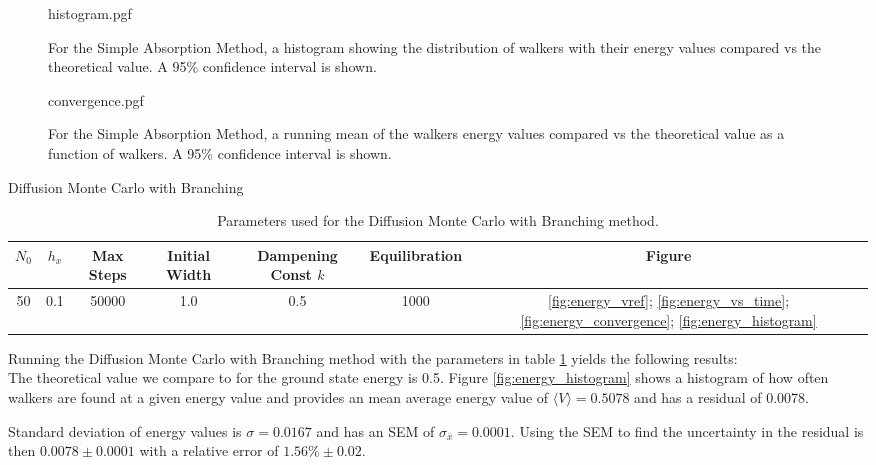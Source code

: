 \documentclass[reqno]{amsart}
\makeatletter
\renewcommand\subsection{\@startsection{subsection}{2}%
  \z@{.5\linespacing\@plus.7\linespacing}{-.5em}%
  {\normalfont\scshape\justify}}
\numberwithin{equation}{section}
\numberwithin{figure}{section}
\makeatother
\begin{document}
\begin{figure}[h]
    \centering
    {histogram.pgf}
    \caption{For the Simple Absorption Method, a histogram showing the distribution of walkers with their energy values compared vs the theoretical value. A 95\% confidence interval is shown.}
    \label{fig:SA_histogram}
\end{figure}

\begin{figure}[h]
    \centering
    {convergence.pgf}
    \caption{For the Simple Absorption Method, a running mean of the walkers energy values compared vs the theoretical value as a function of walkers. A 95\% confidence interval is shown.}
    \label{fig:SA_convergence}
\end{figure}

\subsection{Diffusion Monte Carlo with Branching}

\begin{table}[h]
    \centering
    \begin{tabular}{ccccccc}
        \hline
        $N_0$ & $h_x$ & Max Steps & Initial Width & Dampening Const $k$ & Equilibration & Figure \\
        \hline
        50 & 0.1 & 50000 & 1.0 & 0.5 & 1000 & \ref{fig:energy_vref}; \ref{fig:energy_vs_time}; \ref{fig:energy_convergence}; \ref{fig:energy_histogram} \\
        \hline
    \end{tabular}
    \caption{Parameters used for the Diffusion Monte Carlo with Branching method.}
    \label{tab:DMCB_params}
\end{table}

Running the Diffusion Monte Carlo with Branching method with the parameters in table \ref{tab:DMCB_params} yields the following results: \\

The theoretical value we compare to for the ground state energy is 0.5. Figure \ref{fig:energy_histogram} shows a histogram of how often walkers are found at a given energy value and provides an mean average energy value of $\langle V \rangle = 0.5078$ and has a residual of 0.0078.

Standard deviation of energy values is $\sigma = 0.0167$ and has an SEM of $\sigma_{\bar{x}} = 0.0001$. Using the SEM to find the uncertainty in the residual is then $0.0078 \pm 0.0001$ with a relative error of $1.56\% \pm 0.02$. \\
\end{document}
